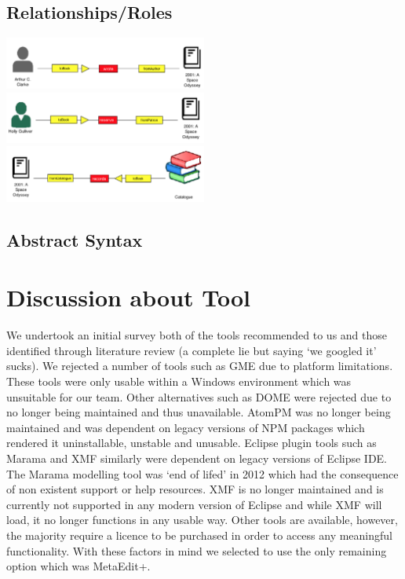\documentclass[12pt]{article}
\begin{document}
\subsection{Relationships/Roles}
\includegraphics[width=0.5\textwidth]{rel_wrote}
\includegraphics[width=0.5\textwidth]{rel_reserve}
\includegraphics[width=0.5\textwidth]{rel_records}


\subsection{Abstract Syntax}
\section{Discussion about Tool}
We undertook an initial survey both of the tools recommended to us and those identified through literature review (a complete lie but saying ‘we googled it’ sucks). 
We rejected a number of tools such as GME due to platform limitations. These tools were only usable within a Windows environment which was unsuitable for our team. Other alternatives such as DOME were rejected due to no longer being maintained and thus unavailable. AtomPM was no longer being maintained and was dependent on legacy versions of NPM packages which rendered it uninstallable, unstable and unusable. Eclipse plugin tools such as Marama and XMF similarly were dependent on legacy versions of Eclipse IDE. The Marama modelling tool was ‘end of lifed’ in 2012 which had the consequence of non existent support or help resources. XMF is no longer maintained and is currently not supported in any modern version of Eclipse and while XMF will load, it no longer functions in any usable way. 
Other tools are available, however, the majority require a licence to be purchased in order to access any meaningful functionality. With these factors in mind we selected to use the only remaining option which was MetaEdit+.
\end{document}
